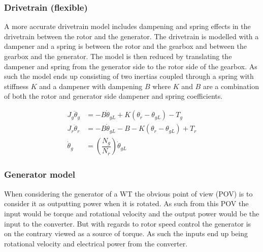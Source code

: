 \subsubsection{Drivetrain (flexible)}
A more accurate drivetrain model includes dampening and spring effects in the drivetrain between the rotor and the generator. The drivetrain is modelled with a dampener and a spring is between the rotor and the gearbox and between the gearbox and the generator. The model is then reduced by translating the dampener and spring from the generator side to the rotor side of the gearbox. As such the model ends up consisting of two inertias coupled through a spring with stiffness $ K $ and a dampener with dampening $ B $ where $ K $ and $ B $ are a combination of both the rotor and generator side dampener and spring coefficients. 

\begin{align} \label{eq:wtlin_comp_drivetrain_flex}
	J_{g} \ddot{\theta}_g & = -B \dot{\theta}_{gL} + K(\theta_r - \theta_{gL}) - T_{g} \\
	J_{r} \ddot{\theta}_r & = -B \dot{\theta}_{gL} -B - K(\theta_r - \theta_{gL}) + T_{r} \\
	\dot{\theta}_g & = \left(\dfrac{N_g}{N_r}\right) \dot{\theta}_{gL}
\end{align}

\clearpage \newpage
\subsubsection{Generator model}
When considering the generator of a WT the obvious point of view (POV) is to consider it as outputting power when it is rotated. As such from this POV the input would be torque and rotational velocity and the output power would be the input to the converter. But with regards to rotor speed control the generator is on the contrary viewed as a source of torque. As such the inputs end up being rotational velocity and electrical power from the converter.

